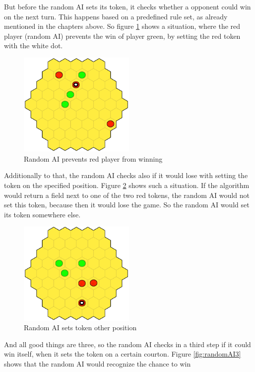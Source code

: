 \documentclass[english]{report} \usepackage[english]{babel}
\begin{document}
But before the random AI 
sets its token, it checks whether a opponent could win on the next turn. This
happens based on a predefined rule set, as already mentioned in the chapters
above. So figure \ref{fig:randomAI1} shows a situation, where the red player
(random AI) prevents the win of player green, by setting the red token with the
white dot.
\begin{figure}[ht]
\centering
\includegraphics[width=0.5\textwidth]{Abbildungen/randomAI1.png}
\caption{Random AI prevents red player from winning }
\label{fig:randomAI1}
\end{figure}
Additionally to that, the random AI checks also if it would lose with setting
the token on the specified position. Figure \ref{fig:randomAI2} shows such a
situation. If the algorithm would return a field next to one of the two red
tokens, the random AI would not set this token, because then it would lose the
game. So the random AI would set its token somewhere else.
\begin{figure}[ht]
\centering
\includegraphics[width=0.5\textwidth]{Abbildungen/randomAI2.png}
\caption{Random AI sets token other position}
\label{fig:randomAI2}
\end{figure}
And all good things are three, so the random AI checks in a third step if it
could win itself, when it sets the token on a certain courton. Figure
\ref{fig:randomAI3} shows that the random AI would recognize the chance to win
\end{document}
